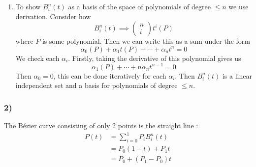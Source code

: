 \begin{enumerate}
\begin{align*}
                                  + 
                                  \begin{pmatrix*}
                                      n-1  \\
                                      i-1  
                                  \end{pmatrix*}
                              \right) t^i\left( 1-t\right) ^{n-i}  \\
                               &= \begin{pmatrix*}
                                   n   \\
                                   i  
                               \end{pmatrix*}
                               t^i\left( 1-t\right) ^{n-i} = B _{ i }^{ n  } (t) \\ 
            \end{align*}
        \item To show $ B _{ i }^{ n  } (t) $ as a basis of the space of polynomials of
            degree $ \leq n  $ we use derivation. 
            Consider how 
            \[
                B _{ i }^{ n  } (t) \implies \begin{pmatrix*}
                    n   \\
                    i  
                \end{pmatrix*} t^i
                \left( P \right)  
            \]
            where $ P $ is some polynomial. Then we can write this as a sum under the form 
            \[
            \alpha_0\left( P\right) + \alpha_1t\left( P\right) + \cdots  + \alpha_nt^n = 0
            \]
            We check each $ \alpha_i $. Firstly, taking the derivative of this polynomial
            gives us 
            \[
                \alpha_1\left( P\right) + \cdots  + n\alpha_nt^{n-1} = 0
            \]
            Then $ \alpha_0 = 0 $, this can be done iteratively for each $ \alpha_i $.
            Then $ B _{ i  }^{ n  } (t)  $ is a linear independent set and a basis for
            polynomials of degree $ \leq n $.  
\end{enumerate}

\subsubsection{2)}
The Bézier curve consisting of only 2 points is the straight line :  
\begin{align*}
    P(t) &= \sum_{i=0}^{1} P_iB _{ i }^{ n  } (t) \\
     &= P_0\left( 1-t\right) + P_1t \\ 
      &= P_0 + \left( P_1 - P_0\right) t \\ 
\end{align*}

